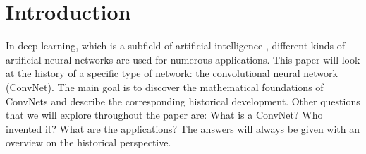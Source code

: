 \section{Introduction}

In deep learning, which is a subfield of artificial intelligence \cite[Ch. 1]{dl-book}, %
different kinds of artificial neural networks are used for numerous applications. This paper will look at the history of a specific type of network: the convolutional neural network (ConvNet). The main goal is to discover the mathematical foundations of ConvNets and describe the corresponding historical development. Other questions that we will explore throughout the paper are: What is a ConvNet? Who invented it? What are the applications? The answers will always be given with an overview on the historical perspective.





